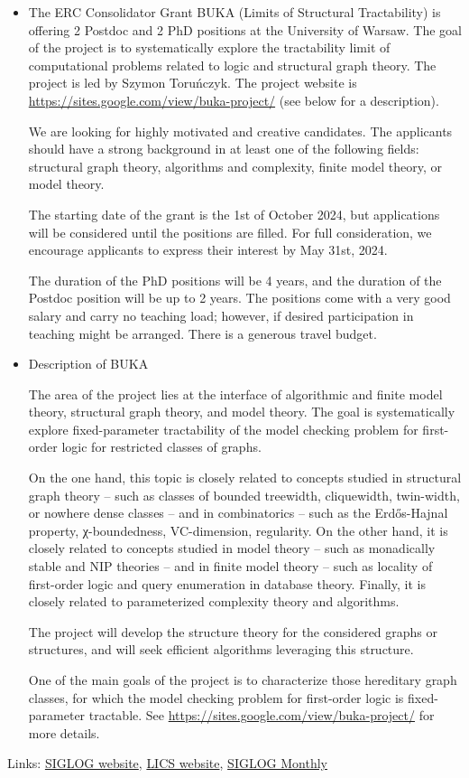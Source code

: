 \documentclass[prodmode,acmtecs]{acmsmall} %
\begin{document}
\begin{itemize}\item   The ERC Consolidator Grant BUKA (Limits of Structural Tractability) is offering 2 Postdoc and 2 PhD positions at the University of Warsaw. The goal of the project is to systematically explore the tractability limit of computational problems related to logic and structural graph theory. The project is led by Szymon Toruńczyk. The project website is \href{https://sites.google.com/view/buka-project/}{https://sites.google.com/view/buka-project/} (see below for a description). 
 
  We are looking for highly motivated and creative candidates. The applicants should have a strong background in at least one of the following fields: structural graph theory, algorithms and complexity, finite model theory, or model theory. 
 
  The starting date of the grant is the 1st of October 2024, but applications will be considered until the positions are filled. For full consideration, we encourage applicants to express their interest by May 31st, 2024.  
 
  The duration of the PhD positions will be 4 years, and the duration of the Postdoc position will be up to 2 years. The positions come with a very good salary and carry no teaching load; however, if desired participation in teaching might be arranged. There is a generous travel budget. 
 
\item  Description of BUKA  
 
  The area of the project lies at the interface of algorithmic and finite model theory, structural graph theory, and model theory. The goal is systematically explore fixed-parameter tractability of the model checking problem for first-order logic for restricted classes of graphs.  
 
  On the one hand, this topic is closely related to concepts studied in structural graph theory – such as classes of bounded treewidth, cliquewidth, twin-width, or nowhere dense classes – and in combinatorics – such as the Erdős-Hajnal property, χ-boundedness, VC-dimension, regularity. On the other hand, it is closely related to concepts studied in model theory – such as monadically stable and NIP theories – and in finite model theory – such as locality of first-order logic and query enumeration in database theory. Finally, it is closely related to parameterized complexity theory and algorithms. 
 
  The project will develop the structure theory for the considered graphs or structures, and will seek efficient algorithms leveraging this structure. 
 
  One of the main goals of the project is to characterize those hereditary graph classes, for which the model checking problem for first-order logic is fixed-parameter tractable. See \href{https://sites.google.com/view/buka-project/}{https://sites.google.com/view/buka-project/} for more details.  
 
\end{itemize}


\bigskip Links: \href{http://siglog.org/}{SIGLOG website}, \href{https://lics.siglog.org}{LICS website}, \href{https://lics.siglog.org/newsletters/}{SIGLOG Monthly}
\end{document}
